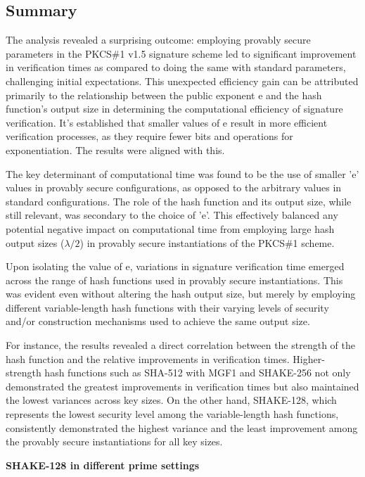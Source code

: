 \documentclass[]{final_report}
\theoremstyle{definition}
\begin{document}
\subsection*{Summary}

The analysis revealed a surprising outcome: employing provably secure parameters in the PKCS\#1 v1.5 signature scheme led to significant improvement in verification times as compared to doing the same with standard parameters, challenging initial expectations. This unexpected efficiency gain can be attributed primarily to the relationship between the public exponent e and the hash function's output size in determining the computational efficiency of signature verification. It's established that smaller values of e result in more efficient verification processes, as they require fewer bits and operations for exponentiation. The results were aligned with this.

The key determinant of computational time was found to be the use of smaller 'e' values in provably secure configurations, as opposed to the arbitrary values in standard configurations. The role of the hash function and its output size, while still relevant, was secondary to the choice of 'e'. This effectively balanced any potential negative impact on computational time from employing large hash output sizes ($\lambda / 2$) in provably secure instantiations of the PKCS\#1 scheme. 

Upon isolating the value of e, variations in signature verification time emerged across the range of hash functions used in provably secure instantiations. This was evident even without altering the hash output size, but merely by employing different variable-length hash functions with their varying levels of security and/or construction mechanisms used to achieve the same output size.

For instance, the results revealed a direct correlation between the strength of the hash function and the relative improvements in verification times. Higher-strength hash functions such as SHA-512 with MGF1 and SHAKE-256 not only demonstrated the greatest improvements in verification times but also maintained the lowest variances across key sizes. On the other hand, SHAKE-128, which represents the lowest security level among the variable-length hash functions, consistently demonstrated the highest variance and the least improvement among the provably secure instantiations for all key sizes.

\newpage
\textbf{SHAKE-128 in different prime settings}
\end{document}
